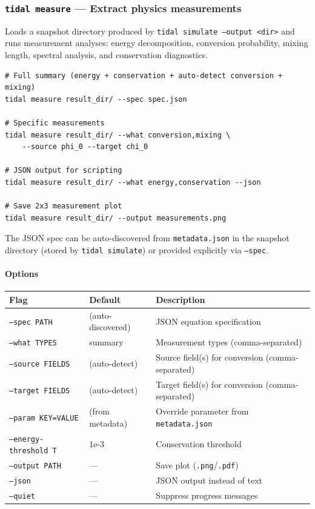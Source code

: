 \subsubsection{\texttt{tidal measure} --- Extract physics measurements}

Loads a snapshot directory produced by \texttt{tidal simulate --output <dir>} and runs measurement analyses: energy decomposition, conversion probability, mixing length, spectral analysis, and conservation diagnostics.

\begin{lstlisting}[style=bash]
# Full summary (energy + conservation + auto-detect conversion + mixing)
tidal measure result_dir/ --spec spec.json

# Specific measurements
tidal measure result_dir/ --what conversion,mixing \
    --source phi_0 --target chi_0

# JSON output for scripting
tidal measure result_dir/ --what energy,conservation --json

# Save 2x3 measurement plot
tidal measure result_dir/ --output measurements.png
\end{lstlisting}

The JSON spec can be auto-discovered from \texttt{metadata.json} in the snapshot directory (stored by \texttt{tidal simulate}) or provided explicitly via \texttt{--spec}.

\paragraph{Options}

\begin{table}[htbp]
\centering
\begin{tabular}{@{}llp{5cm}@{}}
\toprule
Flag & Default & Description \\
\midrule
\texttt{--spec PATH}            & (auto-discovered) & JSON equation specification \\
\texttt{--what TYPES}           & summary           & Measurement types (comma-separated) \\
\texttt{--source FIELDS}        & (auto-detect)     & Source field(s) for conversion (comma-separated) \\
\texttt{--target FIELDS}        & (auto-detect)     & Target field(s) for conversion (comma-separated) \\
\texttt{--param KEY=VALUE}      & (from metadata)   & Override parameter from \texttt{metadata.json} \\
\texttt{--energy-threshold T}   & 1e-3              & Conservation threshold \\
\texttt{--output PATH}          & ---               & Save plot (\texttt{.png}/\texttt{.pdf}) \\
\texttt{--json}                 & ---               & JSON output instead of text \\
\texttt{--quiet}                & ---               & Suppress progress messages \\
\bottomrule
\end{tabular}
\end{table}

